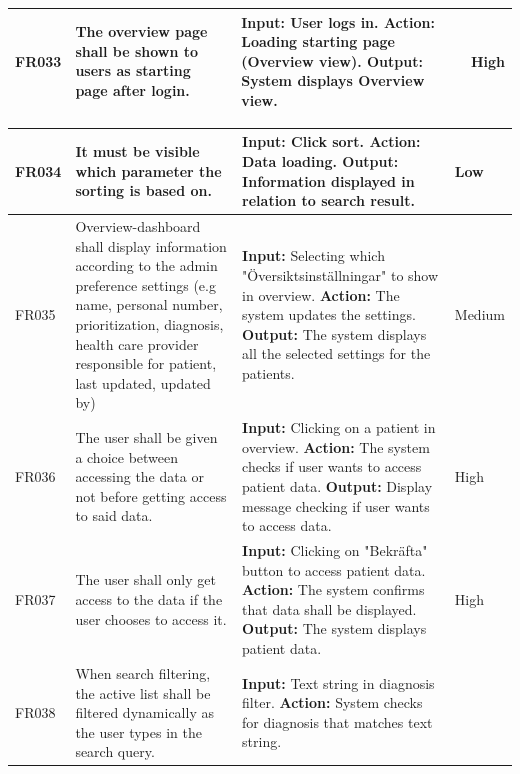 \documentclass{scrreprt}
\begin{document}
\begin{center}
\begin{tabularx}{\linewidth}{| l | X | X | l |}
\hline
FR033 & The overview page shall be shown to users as starting page after login. & \textbf{Input:} User logs in.
\newline \textbf{Action:} Loading starting page (Overview view).
\newline \textbf{Output:} System displays Overview view. & High \\ 
\hline
\end{tabularx}
\begin{tabularx}{\linewidth}{| l | X | X | l |}
\hline
FR034 & It must be visible which parameter the sorting is based on. & \textbf{Input:} Click sort.
\newline \textbf{Action:} Data loading.
\newline \textbf{Output:} Information displayed in relation to search result. & Low \\ 
\hline
FR035 & Overview-dashboard shall display information according to the admin preference settings (e.g name, personal number, prioritization, diagnosis, health care provider responsible for patient, last updated, updated by) & \textbf{Input:} Selecting which "Översiktsinställningar" to show in overview.
\newline \textbf{Action:} The system updates the settings.
\newline \textbf{Output:} The system displays all the selected settings for the patients. & Medium \\ 
\hline
FR036 & The user shall be given a choice between accessing the data or not before getting access to said data. & \textbf{Input:} Clicking on a patient in overview.
\newline \textbf{Action:} The system checks if user wants to access patient data.
\newline \textbf{Output:} Display message checking if user wants to access data. & High \\ 
\hline
FR037 & The user shall only get access to the data if the user chooses to access it. & \textbf{Input:} Clicking on "Bekräfta" button to access patient data.
\newline \textbf{Action:} The system confirms that data shall be displayed.
\newline \textbf{Output:} The system displays patient data. & High \\ 
\hline
FR038 & When search filtering, the active list shall be filtered dynamically as the user types in the search query. & \textbf{Input:} Text string in diagnosis filter.
\newline \textbf{Action:} System checks for diagnosis that matches text string.

\end{tabularx}
\end{center}
\end{document}
